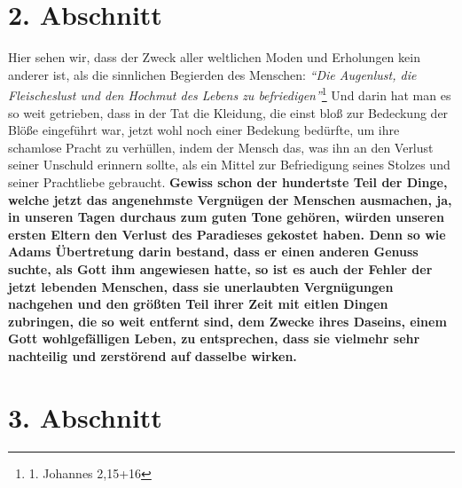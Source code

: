 \section{2. Abschnitt} \label{kap17_ab2}

Hier sehen wir, dass der Zweck aller weltlichen Moden und Erholungen kein
anderer ist, als die sinnlichen Begierden des Menschen:
\textit{"`Die Augenlust, die
Fleischeslust und den Hochmut des Lebens zu befriedigen"'}\footnote{1. Johannes
2,15+16}
Und darin hat man es so weit getrieben, dass in der Tat die Kleidung, die
einst bloß zur Bedeckung der Blöße eingeführt war, jetzt wohl noch einer
Bedekung bedürfte, um ihre schamlose Pracht zu verhüllen, indem der Mensch das,
was ihn an den Verlust seiner Unschuld erinnern sollte, als ein Mittel zur
Befriedigung seines Stolzes und seiner Prachtliebe gebraucht.
\label{ref:17_02_adam_und_eva}
\textbf{Gewiss schon der
hundertste Teil der Dinge, welche jetzt das angenehmste Vergnügen der Menschen
ausmachen, ja, in unseren Tagen durchaus zum guten Tone gehören, würden unseren
ersten Eltern den Verlust des Paradieses gekostet haben. Denn so wie
Adams
Übertretung darin bestand, dass er einen anderen Genuss suchte, als Gott ihm
angewiesen hatte, so ist es auch der Fehler der jetzt lebenden Menschen, dass
sie
unerlaubten Vergnügungen nachgehen und den größten Teil ihrer Zeit mit eitlen
Dingen zubringen, die so weit entfernt sind, dem Zwecke ihres Daseins, einem
Gott wohlgefälligen Leben, zu entsprechen, dass sie vielmehr sehr nachteilig und
zerstörend auf dasselbe wirken.}

\section{3. Abschnitt} \label{kap17_ab3}

